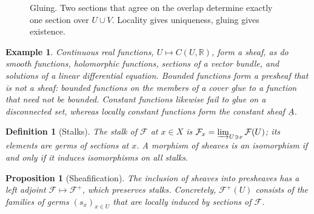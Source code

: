 \documentclass[11pt,a4paper,oneside]{scrartcl}
\theoremstyle{guideplain}
\newtheorem{proposition}[theorem]{Proposition}
\theoremstyle{guidedef}
\newtheorem{definition}[theorem]{Definition}
\newtheorem{example}[theorem]{Example}
\newcommand{\F}{\mathcal{F}}
\newcommand{\R}{\mathbb{R}}
\begin{document}
\begin{figure}[tp]
  \centering
  \caption{Gluing. Two sections that agree on the overlap determine exactly one section over
    $U\cup V$. Locality gives uniqueness, gluing gives existence.}
  \label{fig:gluing}
\end{figure}

\begin{example}
  Continuous real functions, $U\mapsto C(U,\R)$, form a sheaf, as do smooth functions, holomorphic
  functions, sections of a vector bundle, and solutions of a linear differential equation. Bounded
  functions form a presheaf that is not a sheaf: bounded functions on the members of a cover glue to
  a function that need not be bounded. Constant functions likewise fail to glue on a disconnected
  set, whereas \emph{locally} constant functions form the \emph{constant sheaf} $\underline{A}$.
\end{example}

\begin{definition}[Stalks]
  The \emph{stalk} of $\F$ at $x\in X$ is $\F_x=\varinjlim_{U\ni x}\F(U)$; its elements are
  \emph{germs} of sections at $x$. A morphism of sheaves is an isomorphism if and only if it induces
  isomorphisms on all stalks.
\end{definition}

\begin{proposition}[Sheafification]
  The inclusion of sheaves into presheaves has a left adjoint $\F\mapsto\F^{+}$, which preserves
  stalks. Concretely, $\F^{+}(U)$ consists of the families of germs $(s_x)_{x\in U}$ that are locally
  induced by sections of $\F$.
\end{proposition}
\end{document}
